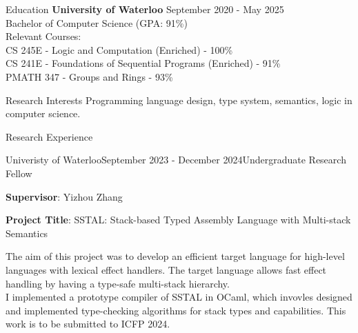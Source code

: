 \documentclass[
	12pt, %
]{resume} %
\begin{document}

\begin{rSection}{Education}
	\textbf{University of Waterloo} \hfill {September 2020 - May 2025} \\ 
	Bachelor of Computer Science (GPA: 91\%) \\
    Relevant Courses: \\
    \hspace*{5mm} CS 245E - Logic and Computation (Enriched) - 100\% \\
    \hspace*{5mm} CS 241E - Foundations of Sequential Programs (Enriched) - 91\% \\
    \hspace*{5mm} PMATH 347 - Groups and Rings - 93\% 
\end{rSection}

\begin{rSection}{Research Interests}
	Programming language design, type system, semantics, logic in computer science.
\end{rSection}

\begin{rSection}{Research Experience}
	\begin{rSubsection}{Univeristy of Waterloo}{September 2023 - December 2024}{Undergraduate Research Fellow}{}
		\item \textbf{Supervisor}: Yizhou Zhang
		\item \textbf{Project Title}: SSTAL: Stack-based Typed Assembly Language with Multi-stack Semantics
		\item The aim of this project was to develop an efficient target language for high-level languages with lexical effect handlers.
		The target language allows fast effect handling by having a type-safe multi-stack hierarchy.
		\\ I implemented a prototype compiler of SSTAL in OCaml, which invovles designed and implemented type-checking algorithms for stack types and capabilities.
		This work is to be submitted to ICFP 2024.
	\end{rSubsection}
\end{rSection}

\end{document}
